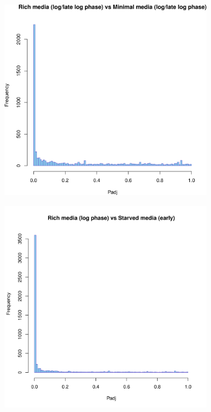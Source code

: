 \begin{figure}[H]
\begin{subfigure}{0.49\textwidth}
\end{subfigure}
\begin{subfigure}{0.49\textwidth}
\includegraphics[width=0.9\linewidth]{psa/hist_richloglate_minimal.png}
\end{subfigure}
\begin{subfigure}{0.49\textwidth}
\includegraphics[width=0.9\linewidth]{psa/hist_richlog_starved.png}
\end{subfigure}

\end{figure}
